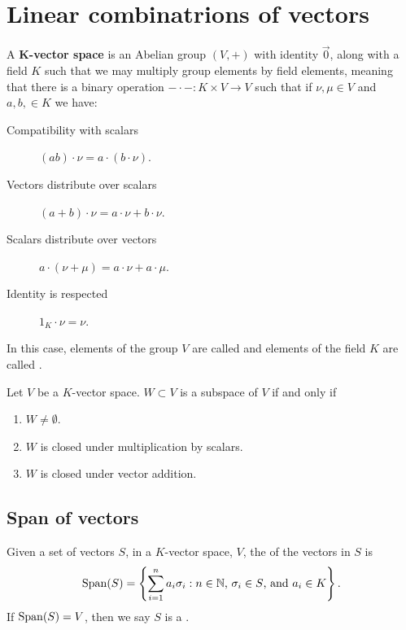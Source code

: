 \documentclass{ximera}
\begin{document}
\section{Linear combinatrions of vectors}

\begin{definition}
  A \textbf{$\boldsymbol{K}$-vector space} is an Abelian group $(V,+)$
  with identity $\vec{0}$, along with a field $K$ such that we may
  multiply group elements by field elements, meaning that there is a
  binary operation $-\cdot-: K\times V \to V$ such that if $\nu,\mu\in
  V$ and $a,b,\in K$ we have:
\begin{description}
\item[Compatibility with scalars] $(ab)\cdot \nu = a\cdot (b\cdot \nu)$.
\item[Vectors distribute over scalars] $(a+b)\cdot \nu =
  a\cdot\nu + b\cdot \nu$.
\item[Scalars distribute over vectors] $a\cdot (\nu+\mu) =
  a\cdot \nu + a\cdot \mu$.
\item[Identity is respected] $1_K\cdot \nu = \nu$.
\end{description}
In this case, elements of the group $V$ are called  and
elements of the field $K$ are called .
\end{definition}

\begin{lemma}
  Let $V$ be a $K$-vector space. $W\subset V$ is a subspace of $V$ if
  and only if
  \begin{enumerate}
  \item $W\ne \emptyset$.
  \item $W$ is closed under multiplication by scalars.
  \item $W$ is closed under vector addition.
  \end{enumerate}
\end{lemma}

\subsection{Span of vectors}

\begin{definition}
  Given a set of vectors $S$, in a $K$-vector space, $V$, the
   of the vectors in $S$ is
  \[
  \operatorname{Span}(S) = \left\{\sum_{i=1}^n a_i\sigma_i:\text{$n\in \mathbb N$,
    $\sigma_i\in S$, and $a_i\in K$}\right\}.
  \]
  If $\operatorname{Span}(S) = V$, then we say $S$ is a .
\end{definition}
\end{document}

